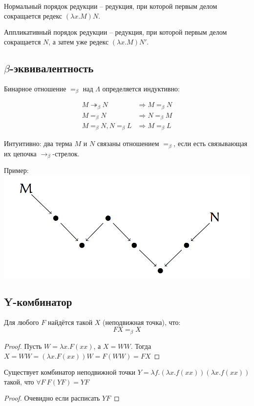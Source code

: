 Нормальный порядок редукции -- редукция, при которой первым делом сокращается
редекс $(\lambda x . M) N$.

Аппликативный порядок редукции -- редукция, при которой первым делом сокращается
$N$, а затем уже редекс $(\lambda x . M) N'$.

\subsection{$\beta$-эквивалентность}
\label{sec-3-6}

Бинарное отношение $=_\beta$ над $\Lambda$ определяется индуктивно:

\begin{align*}
M \twoheadrightarrow_\beta N &\Rightarrow M =_\beta N \\
M =_\beta N &\Rightarrow N =_\beta M \\
M =_\beta N, N =_\beta L &\Rightarrow M =_\beta L
\end{align*}

Интуитивно: два терма $M$ и $N$ связаны отношением $=_\beta$, если есть
связывающая их цепочка $\rightarrow_\beta$-стрелок.

Пример: \\
\includegraphics[scale=0.5]{resources/beta_equality.png}

\subsection{Y-комбинатор}
\label{sec-3-7}

\begin{theorem}
Для любого $F$ найдётся такой $X$ (неподвижная точка), что:
\begin{equation}
F X =_\beta X
\end{equation}
\end{theorem}
\begin{proof}
Пусть $W = \lambda x . F (x x)$, а $X = WW$. Тогда $X = WW = (\lambda x . F (x
x)) W = F (W W) = F X$
\end{proof}

\begin{theorem}
Существует комбинатор неподвижной точки $Y = \lambda f . (\lambda x . f (x x))
(\lambda x . f (x x))$ такой, что $\forall F \  F (Y F) = Y F$
\end{theorem}
\begin{proof}
Очевидно если расписать $Y F$
\end{proof}

